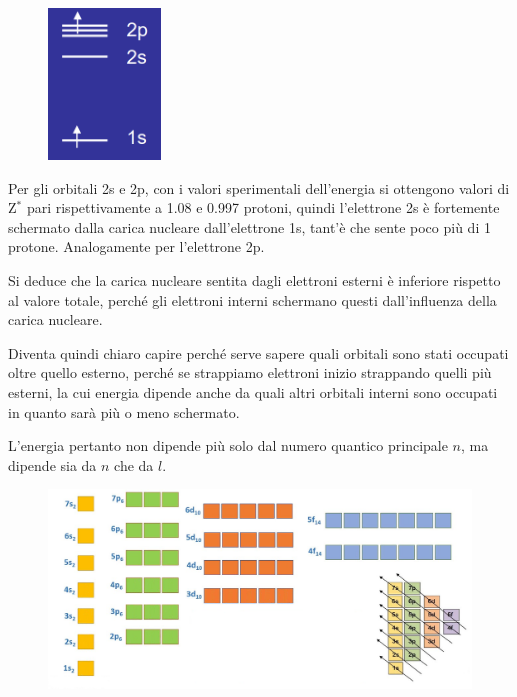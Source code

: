 \hspace{0.5cm}\begin{minipage}{0.25\textwidth}
  \begin{figure}[H]
    \includegraphics[width=3cm]{immagini/elettrone_2p.png}
  \end{figure}
\end{minipage}
\begin{minipage}{0.7\textwidth}
  \vspace{0.6cm}Per gli orbitali 2s e 2p, con i valori sperimentali dell'energia si ottengono valori di Z$^*$ pari rispettivamente a 1.08 e 0.997 protoni, quindi l'elettrone 2s è fortemente schermato dalla carica nucleare dall'elettrone 1s, tant'è che sente poco più di 1 protone. Analogamente per l'elettrone 2p.

  Si deduce che la carica nucleare sentita dagli elettroni esterni è inferiore rispetto al valore totale, perché gli elettroni interni schermano questi dall'influenza della carica nucleare.
\end{minipage}

\vspace{0.3cm}Diventa quindi chiaro capire perché serve sapere quali orbitali sono stati occupati oltre quello esterno, perché se strappiamo elettroni inizio strappando quelli più esterni, la cui energia dipende anche da quali altri orbitali interni sono occupati in quanto sarà più o meno schermato.

L'energia pertanto non dipende più solo dal numero quantico principale $n$, ma dipende sia da $n$ che da $l$.

\begin{figure}[htp]
  \centering
  \includegraphics[width=14cm]{immagini/livelli_orbitali.png}
\end{figure}

